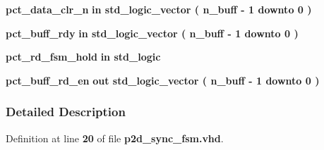 \begin{DoxyCompactItemize}
\item 
{\bf pct\+\_\+data\+\_\+clr\+\_\+n}  {\bfseries {\bfseries \textcolor{keywordflow}{in}\textcolor{vhdlchar}{ }}} {\bfseries \textcolor{comment}{std\+\_\+logic\+\_\+vector}\textcolor{vhdlchar}{ }\textcolor{vhdlchar}{(}\textcolor{vhdlchar}{ }\textcolor{vhdlchar}{ }\textcolor{vhdlchar}{ }\textcolor{vhdlchar}{ }{\bfseries {\bf n\+\_\+buff}} \textcolor{vhdlchar}{-\/}\textcolor{vhdlchar}{ } \textcolor{vhdldigit}{1} \textcolor{vhdlchar}{ }\textcolor{keywordflow}{downto}\textcolor{vhdlchar}{ }\textcolor{vhdlchar}{ } \textcolor{vhdldigit}{0} \textcolor{vhdlchar}{ }\textcolor{vhdlchar}{)}\textcolor{vhdlchar}{ }} 
\item 
{\bf pct\+\_\+buff\+\_\+rdy}  {\bfseries {\bfseries \textcolor{keywordflow}{in}\textcolor{vhdlchar}{ }}} {\bfseries \textcolor{comment}{std\+\_\+logic\+\_\+vector}\textcolor{vhdlchar}{ }\textcolor{vhdlchar}{(}\textcolor{vhdlchar}{ }\textcolor{vhdlchar}{ }\textcolor{vhdlchar}{ }\textcolor{vhdlchar}{ }{\bfseries {\bf n\+\_\+buff}} \textcolor{vhdlchar}{-\/}\textcolor{vhdlchar}{ } \textcolor{vhdldigit}{1} \textcolor{vhdlchar}{ }\textcolor{keywordflow}{downto}\textcolor{vhdlchar}{ }\textcolor{vhdlchar}{ } \textcolor{vhdldigit}{0} \textcolor{vhdlchar}{ }\textcolor{vhdlchar}{)}\textcolor{vhdlchar}{ }} 
\item 
{\bf pct\+\_\+rd\+\_\+fsm\+\_\+hold}  {\bfseries {\bfseries \textcolor{keywordflow}{in}\textcolor{vhdlchar}{ }}} {\bfseries \textcolor{comment}{std\+\_\+logic}\textcolor{vhdlchar}{ }} 
\item 
{\bf pct\+\_\+buff\+\_\+rd\+\_\+en}  {\bfseries {\bfseries \textcolor{keywordflow}{out}\textcolor{vhdlchar}{ }}} {\bfseries \textcolor{comment}{std\+\_\+logic\+\_\+vector}\textcolor{vhdlchar}{ }\textcolor{vhdlchar}{(}\textcolor{vhdlchar}{ }\textcolor{vhdlchar}{ }\textcolor{vhdlchar}{ }\textcolor{vhdlchar}{ }{\bfseries {\bf n\+\_\+buff}} \textcolor{vhdlchar}{-\/}\textcolor{vhdlchar}{ } \textcolor{vhdldigit}{1} \textcolor{vhdlchar}{ }\textcolor{keywordflow}{downto}\textcolor{vhdlchar}{ }\textcolor{vhdlchar}{ } \textcolor{vhdldigit}{0} \textcolor{vhdlchar}{ }\textcolor{vhdlchar}{)}\textcolor{vhdlchar}{ }} 
\end{DoxyCompactItemize}


\subsubsection{Detailed Description}


Definition at line {\bf 20} of file {\bf p2d\+\_\+sync\+\_\+fsm.\+vhd}.



